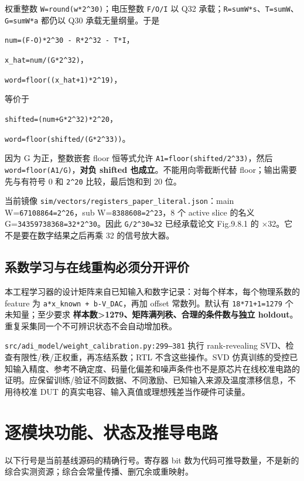 \documentclass[UTF8,fontset=fandol,10pt,a4paper,openany]{ctexrep}
\newcommand{\code}[1]{\nolinkurl{#1}}
\begin{document}
权重整数 \code{W=round(w*2^30)}；电压整数 \code{F/O/I} 以 Q32 承载；\code{R=sumW*s}、\code{T=sumW}、\code{G=sumW*a} 都仍以 Q30 承载无量纲量。于是


\code{num=(F-O)*2^30 - R*2^32 - T*I}，


\code{x_hat=num/(G*2^32)}，


\code{word=floor((x_hat+1)*2^19)}，


等价于


\code{shifted=(num+G*2^32)*2^20}，


\code{word=floor(shifted/(G*2^33))}。


因为 G 为正，整数嵌套 floor 恒等式允许 \code{A1=floor(shifted/2^33)}，然后 \code{word=floor(A1/G)}，\textbf{对负 shifted 也成立}。不能用向零截断代替 floor；输出需要先与有符号 0 和 \code{2^20} 比较，最后饱和到 20 位。


当前镜像 \code{sim/vectors/registers_paper_literal.json}：main W=\code{67108864=2^26}，sub W=\code{8388608=2^23}，8 个 active slice 的名义 G=\code{34359738368=32*2^30}。因此 \code{G/2^30=32} 已经承载论文 Fig.9.8.1 的 \ensuremath{\times}32。它不是要在数字结果之后再乘 32 的信号放大器。


\subsection{系数学习与在线重构必须分开评价}


本工程学习器的设计矩阵来自已知输入和数字记录：对每个样本，每个物理系数的 feature 为 \code{a*x_known + b-V_DAC}，再加 offset 常数列。默认有 \code{18*71+1=1279} 个未知量；至少要求 \textbf{样本数>1279、矩阵满列秩、合理的条件数与独立 holdout}。重复采集同一个不可辨识状态不会自动增加秩。


\code{src/adi_model/weight_calibration.py:299–381} 执行 rank-revealing SVD、检查有限性/秩/正权重，再冻结系数；RTL 不含这些操作。SVD 仿真训练的受控已知输入精度、参考不确定度、码量化偏差和噪声条件也不是原芯片在线校准电路的证明。应保留训练/验证不同数据、不同激励、已知输入来源及温度漂移信息，不用待校准 DUT 的真实电容、输入真值或理想残差当作硬件可读量。


\section{逐模块功能、状态及推导电路}


以下行号是当前基线源码的精确行号。寄存器 bit 数为代码可推导数量，不是新的综合实测资源；综合会常量传播、删冗余或重映射。
\end{document}
